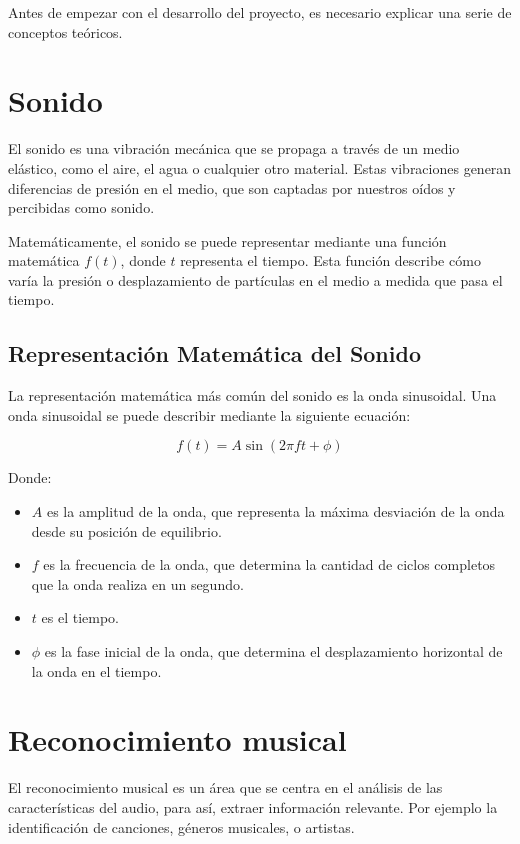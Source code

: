
Antes de empezar con el desarrollo del proyecto, es necesario explicar una serie de conceptos teóricos.

\section{Sonido}

El sonido es una vibración mecánica que se propaga a través de un medio elástico, como el aire, el agua o cualquier otro material. Estas vibraciones generan diferencias de presión en el medio, que son captadas por nuestros oídos y percibidas como sonido.

Matemáticamente, el sonido se puede representar mediante una función matemática $f(t)$, donde $t$ representa el tiempo. Esta función describe cómo varía la presión o desplazamiento de partículas en el medio a medida que pasa el tiempo.

\subsection{Representación Matemática del Sonido}

La representación matemática más común del sonido es la onda sinusoidal. Una onda sinusoidal se puede describir mediante la siguiente ecuación:

\begin{equation}
f(t) = A \sin(2\pi ft + \phi)
\end{equation}

Donde:
\begin{itemize}
\item $A$ es la amplitud de la onda, que representa la máxima desviación de la onda desde su posición de equilibrio.
\item $f$ es la frecuencia de la onda, que determina la cantidad de ciclos completos que la onda realiza en un segundo.
\item $t$ es el tiempo.
\item $\phi$ es la fase inicial de la onda, que determina el desplazamiento horizontal de la onda en el tiempo.
\end{itemize}


\section{Reconocimiento musical}

El reconocimiento musical es un área que se centra en el análisis de las características del audio, para así, extraer información relevante. Por ejemplo la identificación de canciones, géneros musicales, o artistas.

